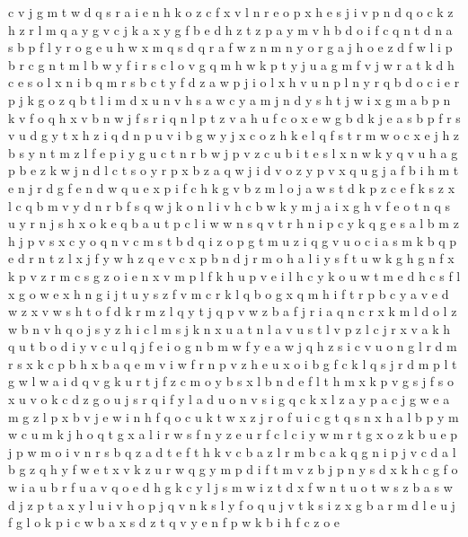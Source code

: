 \documentclass{article}
\begin{document}
c v j g m t w d q s r a i e n h k o
z c f x v l n
r
e
o p
x h e s j i v p n d q o c k z
h z r l m q a y g v c j k
a x y g f b e d h z
t z p a y m v h b d o i f c q n
t d n a s b p f l y r o g e u h w x m q
s d q r a f w z n m
n y o r g
a j h o e z d f w l i p b r c g n
t m l b w y
f i r s c l o v g q m h w k p t y j u a
g m f v j w r a t k d h c e s o l x n i b q
m r s b c t y f d z a w p j i o l x h v u n
p l n y r q b d o c i
e r p j k g o z q b t l i m d x u n v h s a w c y
a m j n
d y s h t j w i x g m a b p n k v f o
q h x v b n w j f s
r i q n l p t z v a h u f c o x e w g b d k j
e a s
b p f r s v u d g y t x h z i q
d n p u v i b g w y j x c o z h k e l q f s t r m
w o c x e j h z b s y
n t m z l f e p i y g u c
t n r b w j p v z c u
b i t e s l x n w k y
q v u h a g p b e z k w j n d l c t s o y r
p x b z a q w j i d v
o z y p v x q u g j a f b i h m t
e n j r d
g f e n d w
q u e x p i f c h k g v b z m l o j a w s t
d k p z c e
f k s z x l c q b m v y d n
r b f s q w j k o n l i v h
c b w k y m j a i x g h v f e o t n q s u
y r n j s h x o k e q b a u t p c l i w
w n s q
v t r h n i p c y k q g e s a l b m z
h j p v s x c y o q
n v c m s t b d q i z o
p g t m u z i q
g v u o c i a s m k b q p e d r n t z l x j f y w h
z q e v c x p b n d j r m o h a l i y s f t u w k g
h g n f x k p v z r m
c s g z o i e n x v m p l f k h u
p v
e i l h c y
k o u w t m e d h c s f l x g
o w e x h n g i j t u y s z f v m c r k l q b
o g x q m h i f t r p b c y a v e d w z
x v w s h t o f d k r m z l q
y t j q p v w z b a
f j
r i a q n c
r x k m l
d o
l z w b n v h q o j s
y z h i c l m s j k n x u a
t n l a v
u s t l v
p z l c j r x v a k h q u t b o d i
y v c u l q j f e i o g n b m w
f y e a w j q h z s i c v u o n g l r d m
r s x k c p b h
x b a q e m v i w f r n p
v z h e u x o i b g f c k l q s j r d m p
l t
g w l
w a i d q v g k u r t j f z c m o y b s x l
b n d e f l t h m x k p v g s j
f s o x u
v o k
c d z g o u j s r q i f y l a
d u o n v s i g q c k x l z a y
p a c j g w e
a m g z l p x b v j e w i n h f q o c u k t
w x z
j r o f u i c g t q s n x h a l b p y m w
c u m k j h o q t g x a l i r w s f n y z e
u r f c
l c i y w m r t g x o z k b u e p j
p w m o i v n r s b q z a d t e f
t h k v c b a
z l r m b c a k q g n i p j v
c d a l b g z q h y f w e
t x v k z u r w q g y m p d i f
t m v z b j p n y s d x k h c g f o w i a u
b r f u a v q o e d h g k c y l j s m w i z t
d x f w n t u
o t w s z b a
s w d j z p t a x y l u i v
h o p j q v n k s l
y f o q u j v t k s i z x g b a r m d l e
u j f g l o k p i c w b a x s d z t q v y e n
f p w k
b i h f c z o e
\end{document}
